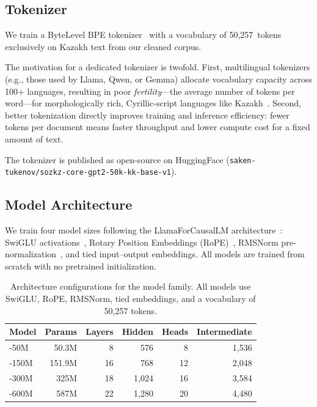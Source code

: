 \subsection{Tokenizer}
\label{sec:tokenizer}

We train a ByteLevel BPE tokenizer~\citep{sennrich2016bpe} with a vocabulary
of 50{,}257~tokens exclusively on Kazakh text from our cleaned corpus.

The motivation for a dedicated tokenizer is twofold. First, multilingual
tokenizers (e.g., those used by Llama, Qwen, or Gemma) allocate vocabulary
capacity across 100+ languages, resulting in poor \emph{fertility}---the average
number of tokens per word---for morphologically rich, Cyrillic-script languages
like Kazakh~\citep{rust2021tokenizer, toraman2023turkic}.
Second, better tokenization directly improves training and inference efficiency:
fewer tokens per document means faster throughput and lower compute cost for a
fixed amount of text.

The tokenizer is published as open-source on HuggingFace
(\texttt{saken-tukenov/sozkz-core-gpt2-50k-kk-base-v1}).

\subsection{Model Architecture}
\label{sec:architecture}

We train four model sizes following the LlamaForCausalLM
architecture~\citep{touvron2023llama}: SwiGLU activations~\citep{shazeer2020glu},
Rotary Position Embeddings (RoPE)~\citep{su2021rope}, RMSNorm
pre-normalization~\citep{zhang2019rmsnorm}, and tied input--output embeddings.
All models are trained from scratch with no pretrained initialization.

\begin{table}[ht]
  \centering
  \caption{Architecture configurations for the \sozkz{} model family.
           All models use SwiGLU, RoPE, RMSNorm, tied embeddings, and
           a vocabulary of 50{,}257 tokens.}
  \label{tab:architecture}
  \begin{tabular}{@{}lrrrrr@{}}
    \toprule
    Model & Params & Layers & Hidden & Heads & Intermediate \\
    \midrule
    \sozkz{}-50M   &  50.3M & 8  & 576   & 8  & 1{,}536 \\
    \sozkz{}-150M  & 151.9M & 16 & 768   & 12 & 2{,}048 \\
    \sozkz{}-300M  & 325M   & 18 & 1{,}024 & 16 & 3{,}584 \\
    \sozkz{}-600M  & 587M   & 22 & 1{,}280 & 20 & 4{,}480 \\
    \bottomrule
  \end{tabular}
\end{table}

